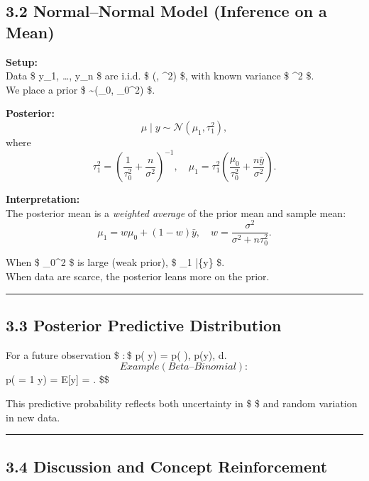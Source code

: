 \documentclass[
  letterpaper,
  DIV=11,
  numbers=noendperiod]{scrreprt}
\begin{document}
\subsection{3.2 Normal--Normal Model (Inference on a
Mean)}\label{normalnormal-model-inference-on-a-mean}

\textbf{Setup:}\\
Data \$ y\_1, \dots, y\_n \$ are i.i.d. \$ (\mu, \sigma\^{}2)
\$, with known variance \$ \sigma\^{}2 \$.\\
We place a prior \$ \mu \sim {}(\mu\_0, \tau\_0\^{}2) \$.

\textbf{Posterior:} \[
\mu \mid y \sim \mathcal{N}(\mu_1, \tau_1^2),
\] where\\
\[
\tau_1^2 = \left( \frac{1}{\tau_0^2} + \frac{n}{\sigma^2} \right)^{-1}, \quad
\mu_1 = \tau_1^2 \left( \frac{\mu_0}{\tau_0^2} + \frac{n \bar{y}}{\sigma^2} \right).
\]

\textbf{Interpretation:}\\
The posterior mean is a \emph{weighted average} of the prior mean and
sample mean: \[
\mu_1 = w \mu_0 + (1-w)\bar{y}, \quad w = \frac{\sigma^2}{\sigma^2 + n\tau_0^2}.
\]

When \$ \tau\_0\^{}2 \$ is large (weak prior), \$ \mu\_1
\approx \bar\{y\} \$.\\
When data are scarce, the posterior leans more on the prior.

\begin{center}\rule{0.5\linewidth}{0.5pt}\end{center}

\subsection{3.3 Posterior Predictive
Distribution}\label{posterior-predictive-distribution}

For a future observation \$  \(:\)\$ p( \mid y) =
\int p( \mid \theta), p(\theta \mid y), d\theta. \[
Example (Beta–Binomial):
\] p( = 1 \mid y) = E{[}\theta \mid y{]} =
. \$\$

This predictive probability reflects both uncertainty in \$ \theta \$
and random variation in new data.

\begin{center}\rule{0.5\linewidth}{0.5pt}\end{center}

\subsection{3.4 Discussion and Concept
Reinforcement}\label{discussion-and-concept-reinforcement}
\end{document}
